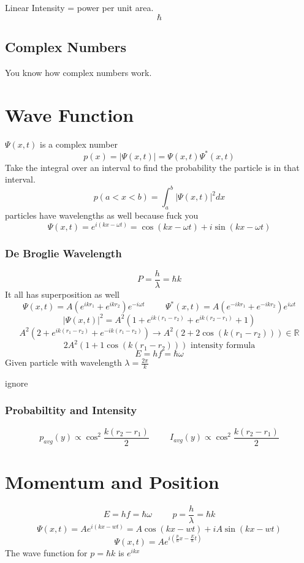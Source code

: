 \documentclass[fleqn]{report}
\newcommand{\hp}{\hspace{1cm}}
\begin{document}
Linear Intensity = power per unit area.
\[
\hbar
\]


\section{Complex Numbers}
You know how complex numbers work.



\chapter{Wave Function}
$\Psi (x, t)$ is a complex number
\[
p(x) = |\Psi (x, t)| = \Psi (x, t)\Psi^* (x, t)
\]
Take the integral over an interval to find the probability the particle is in that interval.
\[
p(a < x < b) = \int^b_a |\Psi (x, t)|^2 dx
\]
particles have wavelengths as well because fuck you
\[
\Psi (x, t) = e^{i(kx - \omega t)} = \cos (kx - \omega t) + i \sin (kx - \omega t)
\]
\subsection{De Broglie Wavelength}
\[
P = \frac{h}{\lambda} = \hbar k
\]
It all has superposition as well
\[
\Psi (x, t) = A (e^{ikr_{1}} + e^{ikr_{2}})e^{-i \omega t}
\hp
\Psi^* (x, t) = A (e^{-ikr_{1}} + e^{-ikr_{2}})e^{i \omega t}
\]
\[
|\Psi(x, t)|^2 = A^2 \left( 1 + e^{ik (r_1 - r_2)} + e^{ik(r_2 - r_1)} + 1 \right)
\]
\[
 A^2 \left( 2 + e^{ik (r_1 - r_2)} + e^{-ik(r_1 - r_2)} \right)
 \rightarrow
 A^2 (2 + 2 \cos (k(r_1 - r_2))) \in \mathbb{R}
\]
\[
2A^2 (1 + 1 \cos (k(r_1 - r_2))) \textrm{ intensity formula}
\]
\[
E = hf = \hbar \omega
\]
Given particle with wavelength $\lambda = \frac{2 \pi}{k}$

ignore

\subsection{Probabiltity and Intensity}
\[
p_{avg}(y) \propto \cos^2 \frac{k(r_2 - r_1)}{2}
\hp
I_{avg}(y) \propto \cos^2 \frac{k(r_2 - r_1)}{2}
\]


\chapter{Momentum and Position}
\[
E = hf = \hbar \omega
\hp
p = \frac{h}{\lambda} = \hbar k
\]
\[
\Psi (x, t) = Ae^{i(kx - wt)}
=
A \cos (kx - wt) + iA \sin (kx - wt)
\]
\[
\Psi (x, t ) = Ae^{i (\frac{p}{\hbar} x - \frac{E}{\hbar} t)} \ 
\]
The wave function for $p = \hbar k$ is $e^{ikx}$
\end{document}
